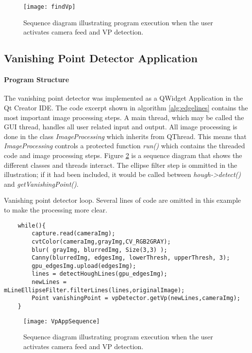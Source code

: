 \begin{figure}
	\texttt{[image: findVp]}
	\caption{Sequence diagram illustrating program execution when the user activates camera feed and VP detection.}
	\label{fig:findVp}
\end{figure}

\subsection{Vanishing Point Detector Application}

\paragraph{Program Structure}

The vanishing point detector was implemented as a QWidget Application in the Qt Creator IDE. The code excerpt shown in algorithm \ref{alg:edgelines} contains the most important image processing steps. A main thread, which may be called the GUI thread, handles all user related input and output. All image processing is done in the class \textit{ImageProcessing} which inherits from QThread. This means that \textit{ImageProcessing} controls a protected function \textit{run()} which contains the threaded code and image processing steps. Figure \ref{fig:VpAppSequence} is a sequence diagram that shows the different classes and threads interact. The ellipse filter step is ommitted in the illustration; if it had been included, it would be called between \textit{hough->detect()} and \textit{getVanishingPoint()}.

\begin{algorithm}[h]
	\caption{Vanishing point detector loop. Several lines of code are omitted in this example to make the processing more clear.}
	\label{alg:edgelines}
	\begin{verbatim}
	while(){
	    capture.read(cameraImg);
	    cvtColor(cameraImg,grayImg,CV_RGB2GRAY);
	    blur( grayImg, blurredImg, Size(3,3) );
	    Canny(blurredImg, edgesImg, lowerThresh, upperThresh, 3);
	    gpu_edgesImg.upload(edgesImg);
	    lines = detectHoughLines(gpu_edgesImg);   
	    newLines = mLineEllipseFilter.filterLines(lines,originalImage);
	    Point vanishingPoint = vpDetector.getVp(newLines,cameraImg);     
	}
	\end{verbatim}
\end{algorithm}

\begin{landscape}
	\begin{figure}
		\texttt{[image: VpAppSequence]}
		\caption{Sequence diagram illustrating program execution when the user activates camera feed and VP detection.}
		\label{fig:VpAppSequence}
	\end{figure}
\end{landscape}



